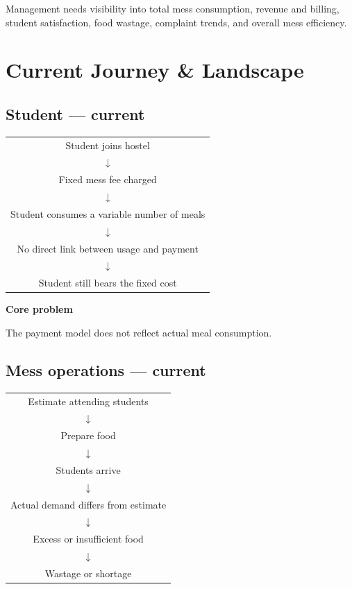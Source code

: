\documentclass[12pt,a4paper]{article}
\begin{document}
Management needs visibility into total mess consumption, revenue and billing,
student satisfaction, food wastage, complaint trends, and overall mess
efficiency.


\section{Current Journey \& Landscape}

\subsection*{Student --- current}

\begin{center}
\begin{tabular}{c}
Student joins hostel\\
$\downarrow$\\
Fixed mess fee charged\\
$\downarrow$\\
Student consumes a variable number of meals\\
$\downarrow$\\
No direct link between usage and payment\\
$\downarrow$\\
Student still bears the fixed cost
\end{tabular}
\end{center}

\textbf{Core problem}

The payment model does not reflect actual meal consumption.

\subsection*{Mess operations --- current}

\begin{center}
\begin{tabular}{c}
Estimate attending students\\
$\downarrow$\\
Prepare food\\
$\downarrow$\\
Students arrive\\
$\downarrow$\\
Actual demand differs from estimate\\
$\downarrow$\\
Excess or insufficient food\\
$\downarrow$\\
Wastage or shortage
\end{tabular}
\end{center}
\end{document}
